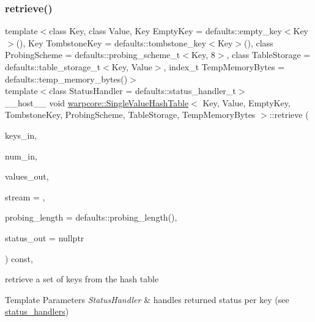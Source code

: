 \subsubsection{\texorpdfstring{retrieve()}{retrieve()}\hspace{0.1cm}{\footnotesize\ttfamily [2/3]}}
{\footnotesize\ttfamily template$<$class Key, class Value, Key Empty\+Key = defaults\+::empty\+\_\+key$<$\+Key$>$(), Key Tombstone\+Key = defaults\+::tombstone\+\_\+key$<$\+Key$>$(), class Probing\+Scheme = defaults\+::probing\+\_\+scheme\+\_\+t$<$\+Key, 8$>$, class Table\+Storage = defaults\+::table\+\_\+storage\+\_\+t$<$\+Key, Value$>$, index\+\_\+t Temp\+Memory\+Bytes = defaults\+::temp\+\_\+memory\+\_\+bytes()$>$ \\
template$<$class Status\+Handler  = defaults\+::status\+\_\+handler\+\_\+t$>$ \\
\+\_\+\+\_\+host\+\_\+\+\_\+ void \hyperlink{classwarpcore_1_1SingleValueHashTable}{warpcore\+::\+Single\+Value\+Hash\+Table}$<$ Key, Value, Empty\+Key, Tombstone\+Key, Probing\+Scheme, Table\+Storage, Temp\+Memory\+Bytes $>$\+::retrieve (\begin{DoxyParamCaption}\item[{const key\+\_\+type $\ast$const}]{keys\+\_\+in,  }\item[{const index\+\_\+type}]{num\+\_\+in,  }\item[{value\+\_\+type $\ast$const}]{values\+\_\+out,  }\item[{const cuda\+Stream\+\_\+t}]{stream = {},  }\item[{const index\+\_\+type}]{probing\+\_\+length = {\ttfamily defaults\+:\+:probing\+\_\+length()},  }\item[{typename Status\+Handler\+::base\+\_\+type $\ast$const}]{status\+\_\+out = {\ttfamily nullptr} }\end{DoxyParamCaption}) const\hspace{0.3cm}{\ttfamily [inline]}, {\ttfamily [noexcept]}}



retrieve a set of keys from the hash table 


\begin{DoxyTemplParams}{Template Parameters}
{\em Status\+Handler} & handles returned status per key (see {\ttfamily \hyperlink{namespacewarpcore_1_1status__handlers}{status\+\_\+handlers}}) \\
\hline
\end{DoxyTemplParams}

